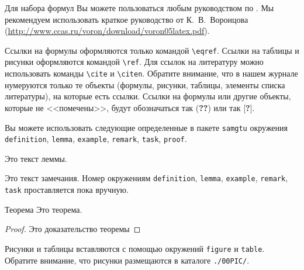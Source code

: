 Для набора формул Вы можете пользоваться любым руководством по \LaTeXe.
Мы рекомендуем использовать краткое руководство от К.~В.~Воронцова (\url{http://www.ccas.ru/voron/download/voron05latex.pdf}).

Ссылки на формулы оформляются только командой \verb"\eqref".
Ссылки на таблицы и рисунки оформляются командой \verb"\ref".
Для ссылок на литературу можно использовать команды \verb"\cite" и \verb"\citen".
Обратите внимание, что в нашем журнале нумеруются только те объекты (формулы, рисунки, таблицы, элементы списка литературы), на которые есть ссылки. 
Ссылки на формулы или другие объекты, которые не <<помечены>>, будут обозначаться так ({\bf ??}) или так [{\bf ?}].


Вы можете использовать следующие определенные в пакете {\tt samgtu} окружения {\tt definition}, {\tt lemma}, {\tt example}, {\tt remark}, {\tt task}, {\tt proof}.

\begin{lemma}
Это текст леммы.
\end{lemma}

\begin{remark}[1]
Это текст замечания. Номер окружениям  {\tt definition}, {\tt lemma}, {\tt example}, {\tt remark}, {\tt task} проставляется пока вручную.
\end{remark}


\begin{newthm}{Теорема} Это теорема.
\end{newthm}

\smallskip

\begin{proof}
Это доказательство теоремы
\end{proof}

Рисунки и таблицы вставляются с помощью окружений {\tt figure} и {\tt table}. 
Обратите внимание, что рисунки размещаются в каталоге {\tt ./00PIC/}.
 
